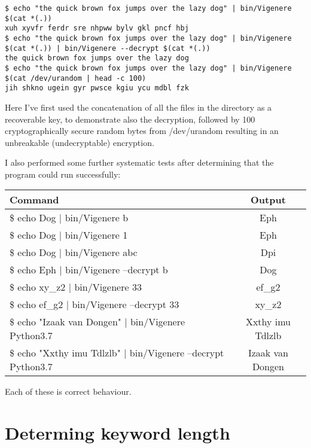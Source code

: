 \documentclass[fleqn,a4paper,11pt]{article}
\begin{document}
\begin{lstlisting}[caption=Using the Vigen\`ere program for a one-time pad]
$ echo "the quick brown fox jumps over the lazy dog" | bin/Vigenere $(cat *(.))
xuh xyvfr ferdr sre nhpww bylv gkl pncf hbj
$ echo "the quick brown fox jumps over the lazy dog" | bin/Vigenere $(cat *(.)) | bin/Vigenere --decrypt $(cat *(.))
the quick brown fox jumps over the lazy dog
$ echo "the quick brown fox jumps over the lazy dog" | bin/Vigenere $(cat /dev/urandom | head -c 100)
jih shkno ugein gyr pwsce kgiu ycu mdbl fzk
\end{lstlisting}
\iffalse $ \fi %

    Here I've first used the concatenation of all the files in the directory as
    a recoverable key, to demonstrate also the decryption, followed by 100
    cryptographically secure random bytes from /dev/urandom resulting in an
    unbreakable (undecryptable) encryption.

    I also performed some further systematic tests after determining that the
    program could run successfully:

    \begin{tabular}{>{\ttfamily}l >{\ttfamily}c}
        \toprule
        Command & Output \\
        \midrule
        \$ echo Dog | bin/Vigenere b & Eph \\
        \$ echo Dog | bin/Vigenere 1 & Eph \\
        \$ echo Dog | bin/Vigenere abc & Dpi \\
        \$ echo Eph | bin/Vigenere --decrypt b & Dog \\
        \$ echo xy\_z2 | bin/Vigenere 33 & ef\_g2 \\
        \$ echo ef\_g2 | bin/Vigenere --decrypt 33 & xy\_z2 \\
        \$ echo "Izaak van Dongen" | bin/Vigenere Python3.7 & Xxthy imu Tdlzlb \\
        \$ echo "Xxthy imu Tdlzlb" | bin/Vigenere --decrypt Python3.7 & Izaak van Dongen \\
        \bottomrule
    \end{tabular}

    Each of these is correct behaviour.

    \section{Determing keyword length}
\end{document}
